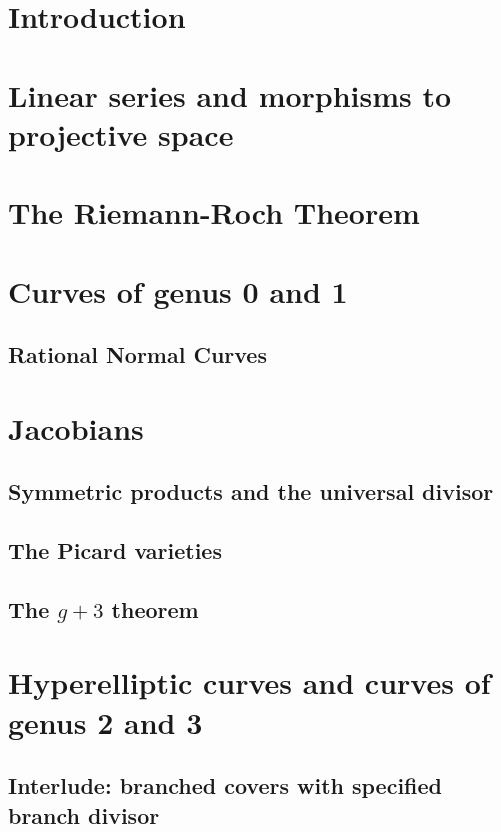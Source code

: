 \chapter{Introduction}
\label{IntroChapter}

\chapter{Linear series and morphisms to projective space}
\label{linear series}

\chapter{The Riemann-Roch Theorem}
\label{RiemannRochChapter}

\chapter{Curves of genus 0 and 1}
\label{genus 0 and 1 chapter}
\section{Rational Normal Curves}\label{rational normal curves section}

\chapter{Jacobians}
\label{Jacobians chapter}\label{new Jacobians chapter}\label{JacobianChapter}
\section{Symmetric products and the universal divisor}\label{symmetric section}
\section{The Picard varieties}\label{Picard section}
\section{The $g+3$ theorem}\label{g+3 section}

\chapter{Hyperelliptic curves and curves of genus 2 and 3}
\label{genus 2 and 3 chapter}
\section{Interlude: branched covers with specified branch divisor}\label{branched covers}
